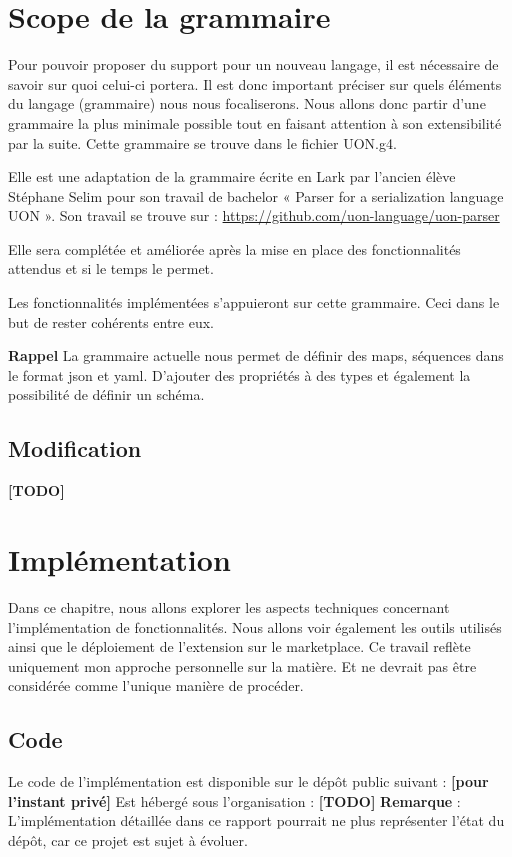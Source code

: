 \documentclass[
    iict, %
    il, %
]{heig-tb}
\begin{document}
\chapter{Scope de la grammaire}
Pour pouvoir proposer du support pour un nouveau langage, il est nécessaire de savoir sur quoi celui-ci portera. Il est donc important préciser sur quels éléments du langage (grammaire) nous nous focaliserons.
Nous allons donc partir d’une grammaire la plus minimale possible tout en faisant attention à son extensibilité par la suite.
Cette grammaire se trouve dans le fichier UON.g4.

Elle est une adaptation de la grammaire écrite en Lark par l’ancien élève Stéphane Selim pour son travail de bachelor « Parser for a serialization language UON ». Son travail se trouve sur : 
\href{https://github.com/uon-language/uon-parser}{https://github.com/uon-language/uon-parser}

Elle sera complétée et améliorée après la mise en place des fonctionnalités attendus et si le temps le permet.

Les fonctionnalités implémentées s’appuieront sur cette grammaire. Ceci dans le but de rester cohérents entre eux.

\textbf{Rappel}
La grammaire actuelle nous permet de définir des maps, séquences dans le format json et yaml. D’ajouter des propriétés à des types et également la possibilité de définir un schéma.

\section{Modification}
\textbf{[TODO]}


\chapter{Implémentation}
Dans ce chapitre, nous allons explorer les aspects techniques concernant l’implémentation de fonctionnalités. Nous allons voir également les outils utilisés ainsi que le déploiement de l’extension sur le marketplace.
Ce travail reflète uniquement mon approche personnelle sur la matière. Et ne devrait pas être considérée comme l’unique manière de procéder.

\section{Code}
Le code de l’implémentation est disponible sur le dépôt public suivant : \textbf{[pour l’instant privé]}
Est hébergé sous l’organisation : \textbf{[TODO]}
\textbf{Remarque} : L’implémentation détaillée dans ce rapport pourrait ne plus représenter l’état du dépôt, car ce projet est sujet à évoluer.
\end{document}
